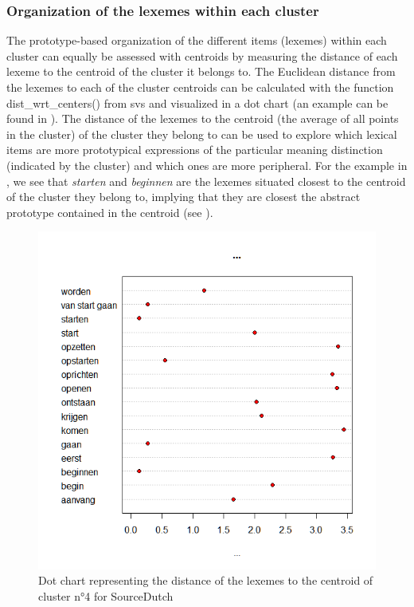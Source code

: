 \subsubsection{\label{sec:3.8.1.2}  Organization of the lexemes within each cluster}

The prototype-based organization of the different items (lexemes) within each cluster can equally be assessed with centroids by measuring the distance of each lexeme to the centroid of the cluster it belongs to. The Euclidean distance from the lexemes to each of the cluster centroids can be calculated with the function dist\_wrt\_centers() from svs and visualized in a dot chart (an example can be found in ). The distance of the lexemes to the centroid (the average of all points in the cluster) of the cluster they belong to can be used to explore which lexical items are more prototypical expressions of the particular meaning distinction (indicated by the cluster) and which ones are more peripheral. For the example in , we see that \textit{starten} and \textit{beginnen} are the lexemes situated closest to the centroid of the cluster they belong to, implying that they are closest the abstract prototype contained in the centroid (see ).


\begin{figure}
\includegraphics[height=.3\textheight]{figures/Vandevoorde2-img49.png}
\caption{\label{fig:key:49}  Dot chart representing the distance of the lexemes to the centroid of cluster n°4 for SourceDutch}
\end{figure}



